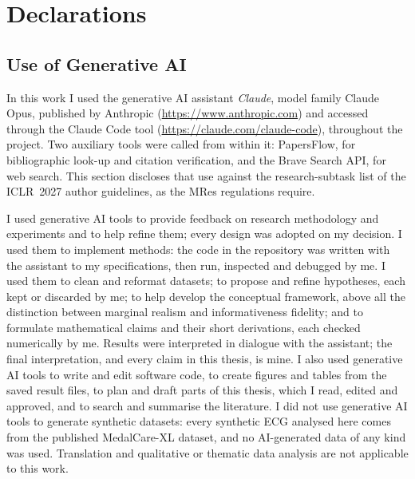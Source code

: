 \chapter{Declarations}
\label{ch:declarations}

\section{Use of Generative AI}
\label{sec:decl-ai}

In this work I used the generative AI assistant \emph{Claude}, model family Claude Opus, published by Anthropic (\url{https://www.anthropic.com}) and accessed through the Claude Code tool (\url{https://claude.com/claude-code}), throughout the project. Two auxiliary tools were called from within it: PapersFlow, for bibliographic look-up and citation verification, and the Brave Search API, for web search. This section discloses that use against the research-subtask list of the ICLR~2027 author guidelines, as the MRes regulations require.

I used generative AI tools to provide feedback on research methodology and experiments and to help refine them; every design was adopted on my decision. I used them to implement methods: the code in the repository was written with the assistant to my specifications, then run, inspected and debugged by me. I used them to clean and reformat datasets; to propose and refine hypotheses, each kept or discarded by me; to help develop the conceptual framework, above all the distinction between marginal realism and informativeness fidelity; and to formulate mathematical claims and their short derivations, each checked numerically by me. Results were interpreted in dialogue with the assistant; the final interpretation, and every claim in this thesis, is mine. I also used generative AI tools to write and edit software code, to create figures and tables from the saved result files, to plan and draft parts of this thesis, which I read, edited and approved, and to search and summarise the literature. I did not use generative AI tools to generate synthetic datasets: every synthetic ECG analysed here comes from the published MedalCare-XL dataset, and no AI-generated data of any kind was used. Translation and qualitative or thematic data analysis are not applicable to this work.


